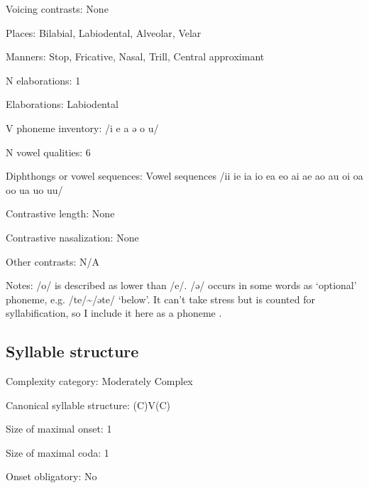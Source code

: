 {\begin{appendixdesc}
\item[Voicing contrasts:] None

\item[Places:] Bilabial, Labiodental, Alveolar, Velar

\item[Manners:] Stop, Fricative, Nasal, Trill, Central approximant

\item[N elaborations:] 1

\item[Elaborations:] Labiodental

\item[V phoneme inventory:] /i e a ə o u/

\item[N vowel qualities:] 6

\item[Diphthongs or vowel sequences:] Vowel sequences /ii ie ia io ea eo ai ae ao au oi oa oo ua uo uu/

\item[Contrastive length:] None

\item[Contrastive nasalization:] None

\item[Other contrasts:] N/A

\item[Notes:] /o/ is described as lower than /e/. /ə/ occurs in some words as ‘optional’ phoneme, e.g. /te/{\textasciitilde}/əte/ ‘below’. It can’t take stress but is counted for syllabification, so I include it here as a phoneme \citep[15--18]{Dol2007}.
\end{appendixdesc}
\subsection*{Syllable structure}
\begin{appendixdesc}

\item[Complexity category:] Moderately Complex

\item[Canonical syllable structure:] (C)V(C) \citep[34--38]{Dol2007}

\item[Size of maximal onset:] 1

\item[Size of maximal coda:] 1

\item[Onset obligatory:] No


\end{appendixdesc}}

